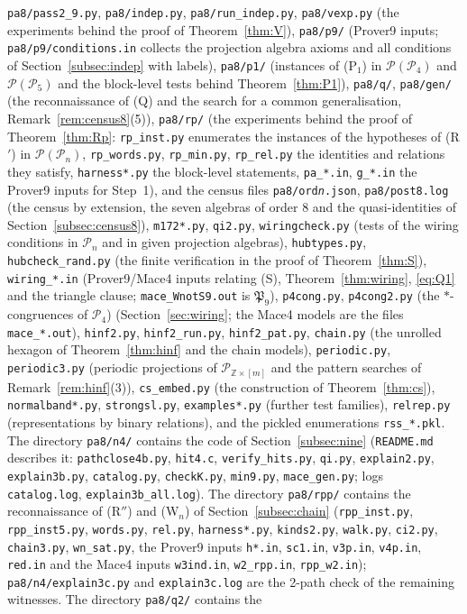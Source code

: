 \documentclass[11pt]{amsart}
\theoremstyle{definition}
\renewcommand{\P}{\mathcal{P}}
\newcommand{\Z}{\mathbb{Z}}
\begin{document}
\texttt{pa8/pass2\_9.py}, \texttt{pa8/indep.py}, \texttt{pa8/run\_indep.py}, \texttt{pa8/vexp.py} (the experiments behind the proof of Theorem~\ref{thm:V}), \texttt{pa8/p9/} (Prover9 inputs; \texttt{pa8/p9/conditions.in} collects the projection algebra axioms and all conditions of Section~\ref{subsec:indep} with labels), \texttt{pa8/p1/} (instances of (P$_1$) in $\P(\P_4)$ and $\P(\P_5)$ and the block-level tests behind Theorem~\ref{thm:P1}), \texttt{pa8/q/}, \texttt{pa8/gen/} (the reconnaissance of (Q) and the search for a common generalisation, Remark~\ref{rem:census8}(5)), \texttt{pa8/rp/} (the experiments behind the proof of Theorem~\ref{thm:Rp}: \texttt{rp\_inst.py} enumerates the instances of the hypotheses of (R$'$) in $\P(\P_n)$, \texttt{rp\_words.py}, \texttt{rp\_min.py}, \texttt{rp\_rel.py} the identities and relations they satisfy, \texttt{harness*.py} the block-level statements, \texttt{pa\_*.in}, \texttt{g\_*.in} the Prover9 inputs for Step~1), and the census files \texttt{pa8/ord\emph{n}.json}, \texttt{pa8/post8.log} (the census by extension, the seven algebras of order $8$ and the quasi-identities of Section~\ref{subsec:census8}), \texttt{m172*.py}, \texttt{qi2.py}, \texttt{wiringcheck.py} (tests of the wiring conditions in $\P_n$ and in given projection algebras), \texttt{hubtypes.py}, \texttt{hubcheck\_rand.py} (the finite verification in the proof of Theorem~\ref{thm:S}), \texttt{wiring\_*.in} (Prover9/Mace4 inputs relating (S), Theorem~\ref{thm:wiring}, \eqref{eq:Q1} and the triangle clause; \texttt{mace\_WnotS9.out} is $\mathfrak P_9$), \texttt{p4cong.py}, \texttt{p4cong2.py} (the $*$-congruences of $\P_4$) (Section~\ref{sec:wiring}; the Mace4 models are the files \texttt{mace\_*.out}), \texttt{hinf2.py}, \texttt{hinf2\_run.py}, \texttt{hinf2\_pat.py}, \texttt{chain.py} (the unrolled hexagon of Theorem~\ref{thm:hinf} and the chain models), \texttt{periodic.py}, \texttt{periodic3.py} (periodic projections of $\P_{\Z\times[m]}$ and the pattern searches of Remark~\ref{rem:hinf}(3)), \texttt{cs\_embed.py} (the construction of Theorem~\ref{thm:cs}), \texttt{normalband*.py}, \texttt{strongsl.py}, \texttt{examples*.py} (further test families), \texttt{relrep.py} (representations by binary relations), and the pickled enumerations \texttt{rss\_*.pkl}. The directory \texttt{pa8/n4/} contains the code of Section~\ref{subsec:nine} (\texttt{README.md} describes it: \texttt{pathclose4b.py}, \texttt{hit4.c}, \texttt{verify\_hits.py}, \texttt{qi.py}, \texttt{explain2.py}, \texttt{explain3b.py}, \texttt{catalog.py}, \texttt{checkK.py}, \texttt{min9.py}, \texttt{mace\_gen.py}; logs \texttt{catalog.log}, \texttt{explain3b\_all.log}). The directory \texttt{pa8/rpp/} contains the reconnaissance of (R$''$) and (W$_n$) of Section~\ref{subsec:chain} (\texttt{rpp\_inst.py}, \texttt{rpp\_inst5.py}, \texttt{words.py}, \texttt{rel.py}, \texttt{harness*.py}, \texttt{kinds2.py}, \texttt{walk.py}, \texttt{ci2.py}, \texttt{chain3.py}, \texttt{wn\_sat.py}, the Prover9 inputs \texttt{h*.in}, \texttt{sc1.in}, \texttt{v3p.in}, \texttt{v4p.in}, \texttt{red.in} and the Mace4 inputs \texttt{w3ind.in}, \texttt{w2\_rpp.in}, \texttt{rpp\_w2.in}); \texttt{pa8/n4/explain3c.py} and \texttt{explain3c.log} are the 2-path check of the remaining witnesses. The directory \texttt{pa8/q2/} contains the 
\end{document}
